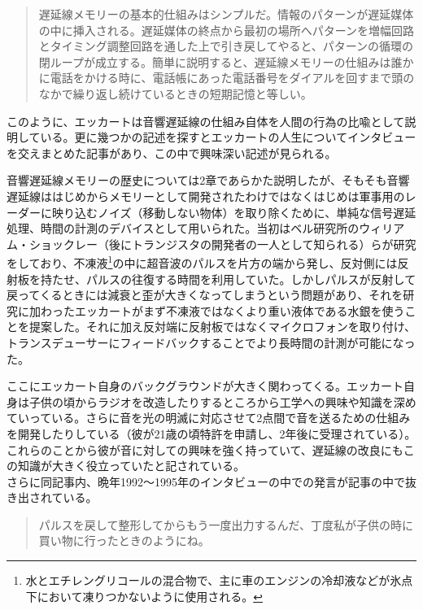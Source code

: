 \documentclass[a4paper,report]{jsbook}
\begin{document}
\begin{quote}
遅延線メモリーの基本的仕組みはシンプルだ。情報のパターンが遅延媒体の中に挿入される。遅延媒体の終点から最初の場所へパターンを増幅回路とタイミング調整回路を通した上で引き戻してやると、パターンの循環の閉ループが成立する。簡単に説明すると、遅延線メモリーの仕組みは誰かに電話をかける時に、電話帳にあった電話番号をダイアルを回すまで頭のなかで繰り返し続けているときの短期記憶と等しい。
\end{quote}

\autocite[筆者訳]{eckert1953survey}このように、エッカートは音響遅延線の仕組み自体を人間の行為の比喩として説明している。更に幾つかの記述を探すとエッカートの人生についてインタビューを交えまとめた記事\autocite{eckstein1996j}があり、この中で興味深い記述が見られる。

音響遅延線メモリーの歴史については2章であらかた説明したが、そもそも音響遅延線ははじめからメモリーとして開発されたわけではなくはじめは軍事用のレーダーに映り込むノイズ（移動しない物体）を取り除くために、単純な信号遅延処理、時間の計測のデバイスとして用いられた。当初はベル研究所のウィリアム・ショックレー（後にトランジスタの開発者の一人として知られる）らが研究をしており、不凍液\footnote{水とエチレングリコールの混合物で、主に車のエンジンの冷却液などが氷点下において凍りつかないように使用される。}の中に超音波のパルスを片方の端から発し、反対側には反射板を持たせ、パルスの往復する時間を利用していた。しかしパルスが反射して戻ってくるときには減衰と歪が大きくなってしまうという問題があり、それを研究に加わったエッカートがまず不凍液ではなくより重い液体である水銀を使うことを提案した。それに加え反対端に反射板ではなくマイクロフォンを取り付け、トランスデューサーにフィードバックすることでより長時間の計測が可能になった。

ここにエッカート自身のバックグラウンドが大きく関わってくる。エッカート自身は子供の頃からラジオを改造したりするところから工学への興味や知識を深めていっている。さらに音を光の明滅に対応させて2点間で音を送るための仕組みを開発したりしている（彼が21歳の頃特許を申請し、2年後に受理されている\autocite{presper1942light}）。これらのことから彼が音に対しての興味を強く持っていて、遅延線の改良にもこの知識が大きく役立っていたと記されている。\\
さらに同記事内、晩年1992〜1995年のインタビューの中での発言が記事の中で抜き出されている。

\begin{quote}
パルスを戻して整形してからもう一度出力するんだ、丁度私が子供の時に買い物に行ったときのようにね。
\end{quote}
\end{document}
